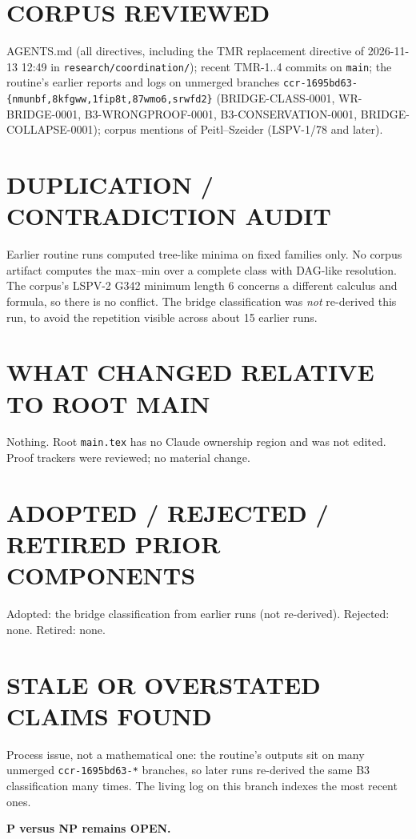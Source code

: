 \documentclass[11pt]{article}
\begin{document}
\section*{CORPUS REVIEWED}
AGENTS.md (all directives, including the TMR replacement directive of 2026-11-13 12:49 in \texttt{research/coordination/}); recent TMR-1..4 commits on \texttt{main}; the routine's earlier reports and logs on unmerged branches \texttt{ccr-1695bd63-\{nmunbf,8kfgww,1fip8t,87wmo6,srwfd2\}} (BRIDGE-CLASS-0001, WR-BRIDGE-0001, B3-WRONGPROOF-0001, B3-CONSERVATION-0001, BRIDGE-COLLAPSE-0001); corpus mentions of Peitl--Szeider (LSPV-1/78 and later).

\section*{DUPLICATION / CONTRADICTION AUDIT}
Earlier routine runs computed tree-like minima on fixed families only. No corpus artifact computes the max--min over a complete class with DAG-like resolution. The corpus's LSPV-2 G342 minimum length 6 concerns a different calculus and formula, so there is no conflict. The bridge classification was \emph{not} re-derived this run, to avoid the repetition visible across about 15 earlier runs.

\section*{WHAT CHANGED RELATIVE TO ROOT MAIN}
Nothing. Root \texttt{main.tex} has no Claude ownership region and was not edited. Proof trackers were reviewed; no material change.

\section*{ADOPTED / REJECTED / RETIRED PRIOR COMPONENTS}
Adopted: the bridge classification from earlier runs (not re-derived). Rejected: none. Retired: none.

\section*{STALE OR OVERSTATED CLAIMS FOUND}
Process issue, not a mathematical one: the routine's outputs sit on many unmerged \texttt{ccr-1695bd63-*} branches, so later runs re-derived the same B3 classification many times. The living log on this branch indexes the most recent ones.

\noindent\textbf{P versus NP remains OPEN.}
\end{document}
